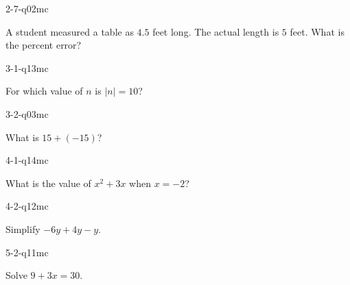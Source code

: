 \begin{practiceQuestion}{2-7-q02}{mc}
\begin{questionText}
A student measured a table as $4.5$ feet long. The actual length is $5$ feet. What is the percent error?
\end{questionText}
\end{practiceQuestion}

\begin{practiceQuestion}{3-1-q13}{mc}
\begin{questionText}
For which value of $n$ is $|n| = 10$?
\end{questionText}
\end{practiceQuestion}

\begin{practiceQuestion}{3-2-q03}{mc}
\begin{questionText}
What is $15 + (-15)$?
\end{questionText}
\end{practiceQuestion}

\begin{practiceQuestion}{4-1-q14}{mc}
\begin{questionText}
What is the value of $x^2 + 3x$ when $x = -2$?
\end{questionText}
\end{practiceQuestion}

\begin{practiceQuestion}{4-2-q12}{mc}
\begin{questionText}
Simplify $-6y + 4y - y$.
\end{questionText}
\end{practiceQuestion}

\begin{practiceQuestion}{5-2-q11}{mc}
\begin{questionText}
Solve $9 + 3x = 30$.
\end{questionText}
\end{practiceQuestion}

